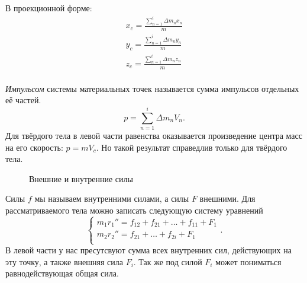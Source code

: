 В проекционной форме:
\begin{align*}
  x_c = \frac{\sum_{n=1}^{i} \Delta m_n x_n}{m} \\
  y_c = \frac{\sum_{n=1}^{i} \Delta m_n y_n}{m} \\
  z_c = \frac{\sum_{n=1}^{i} \Delta m_n z_n}{m} \\
\end{align*}

\emph{Импульсом} системы материальных точек называется сумма импульсов
отдельных её частей. \[
  p = \sum_{n=1}^{i} \Delta m_n V_n
.\] Для твёрдого тела в левой части равенства оказывается произведение центра
масс на его скорость: \( p = m V_c \). Но такой результат справедлив только
для твёрдого тела.

\begin{figure}[htpb]
  \begin{center}
  \end{center}
  \caption{Внешние и внутренние силы}%
  \label{fig:inner-outer-force}
\end{figure}

\begin{theorem}
  Силы \( f \) мы называем внутренними силами, а силы \( F \) внешними. Для
  рассматриваемого тела можно записать следующую систему уравнений \[
    \begin{cases}
      m_1 r_1'' = f_{12} + f_{21} + \ldots + f_{11} + F_1 \\
      m_2 r_2'' = f_{21} + \ldots + f_{2i} + F_1          \\
    \end{cases}
  .\] В левой части у нас пресутсвуют сумма всех внутренних сил, действующих
  на эту точку, а также внешняя сила \( F_i \). Так же под силой \( F_i \)
  может пониматься равнодействующая общая сила.
\end{theorem}

